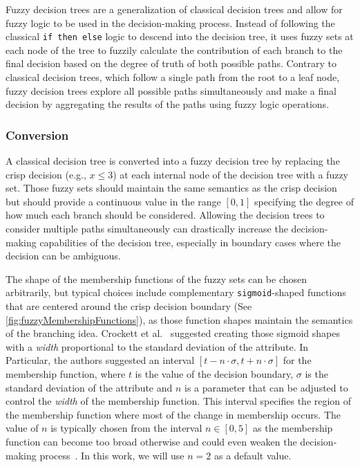 Fuzzy decision trees are a generalization of classical decision trees and allow for fuzzy logic to be used in the decision-making process. Instead of following the classical \texttt{if then else} logic to descend into the decision tree, it uses fuzzy sets at each node of the tree to fuzzily calculate the contribution of each branch to the final decision based on the degree of truth of both possible paths. Contrary to classical decision trees, which follow a single path from the root to a leaf node, fuzzy decision trees explore all possible paths simultaneously and make a final decision by aggregating the results of the paths using fuzzy logic operations.

\subsubsection{Conversion}


A classical decision tree is converted into a fuzzy decision tree by replacing the crisp decision (e.g., $x \leq 3$) at each internal node of the decision tree with a fuzzy set. Those fuzzy sets should maintain the same semantics as the crisp decision but should provide a continuous value in the range $[0,1]$ specifying the degree of how much each branch should be considered. Allowing the decision trees to consider multiple paths simultaneously can drastically increase the decision-making capabilities of the decision tree, especially in boundary cases where the decision can be ambiguous.


The shape of the membership functions of the fuzzy sets can be chosen arbitrarily, but typical choices include complementary \texttt{sigmoid}-shaped functions that are centered around the crisp decision boundary (See \autoref{fig:fuzzyMembershipFunctions}), as those function shapes maintain the semantics of the branching idea. Crockett et al.~\cite{CROCKETT20062809} suggested creating those sigmoid shapes with a \emph{width} proportional to the standard deviation of the attribute. In Particular, the authors suggested an interval $[t-n\cdot \sigma, t+n\cdot \sigma]$ for the membership function, where  $t$ is the value of the decision boundary, $\sigma$ is the standard deviation of the attribute and $n$ is a parameter that can be adjusted to control the \emph{width} of the membership function. This interval specifies the region of the membership function where most of the change in membership occurs. The value of $n$ is typically chosen from the interval $n\in [0,5]$ as the membership function can become too broad otherwise and could even weaken the decision-making process~\cite{CROCKETT20062809}. In this work, we will use $n=2$ as a default value.

